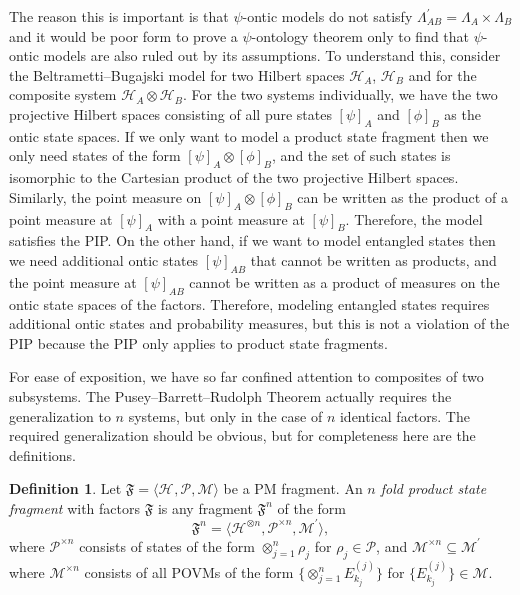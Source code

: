 \documentclass[DIV=calc,fontsize=12pt]{scrartcl} %
\theoremstyle{definition}
\newtheorem{definition}{Definition}[section]
\theoremstyle{plain}
\newcommand{\Proj}[1]{\ensuremath{\left [ #1 \right ]}}
\newcommand{\Hilb}[1][]{\ensuremath{\mathcal{H}_{#1}}}
\begin{document}
The reason this is important is that $\psi$-ontic models do not
satisfy $\Lambda^{\prime}_{AB} = \Lambda_A \times \Lambda_B$ and it
would be poor form to prove a $\psi$-ontology theorem only to find
that $\psi$-ontic models are also ruled out by its assumptions.  To
understand this, consider the Beltrametti--Bugajski model for two
Hilbert spaces $\Hilb[A]$, $\Hilb[B]$ and for the composite system
$\Hilb[A] \otimes \Hilb[B]$.  For the two systems individually, we
have the two projective Hilbert spaces consisting of all pure states
$\Proj{\psi}_A$ and $\Proj{\phi}_B$ as the ontic state spaces.  If we
only want to model a product state fragment then we only need states
of the form $\Proj{\psi}_A \otimes \Proj{\phi}_B$, and the set of such
states is isomorphic to the Cartesian product of the two projective
Hilbert spaces.  Similarly, the point measure on $\Proj{\psi}_A
\otimes \Proj{\phi}_B$ can be written as the product of a point
measure at $\Proj{\psi}_A$ with a point measure at $\Proj{\psi}_B$.
Therefore, the model satisfies the PIP\@.  On the other hand, if we
want to model entangled states then we need additional ontic states
$\Proj{\psi}_{AB}$ that cannot be written as products, and the point
measure at $\Proj{\psi}_{AB}$ cannot be written as a product of
measures on the ontic state spaces of the factors.  Therefore,
modeling entangled states requires additional ontic states and
probability measures, but this is not a violation of the PIP because
the PIP only applies to product state fragments.

For ease of exposition, we have so far confined attention to
composites of two subsystems.  The Pusey--Barrett--Rudolph Theorem actually requires the
generalization to $n$ systems, but only in the case of $n$ identical
factors.  The required generalization should be obvious, but for
completeness here are the definitions.

\begin{definition}
Let $\mathfrak{F} = \langle \Hilb, \mathcal{P}, \mathcal{M} \rangle$
be a PM fragment.  An \emph{$n$ fold product state fragment} with
factors $\mathfrak{F}$ is any fragment $\mathfrak{F}^n$ of the form
\begin{equation}
\mathfrak{F}^n = \langle \Hilb^{\otimes n},
\mathcal{P}^{\times n}, \mathcal{M}^{\prime} \rangle,
\end{equation}
where $\mathcal{P}^{\times n}$ consists of states of the form
$\otimes_{j=1}^n \rho_j$ for $\rho_j \in \mathcal{P}$, and
$\mathcal{M}^{\times n} \subseteq \mathcal{M}^{\prime}$ where
$\mathcal{M}^{\times n}$ consists of all POVMs of the form
$\{\otimes_{j=1}^n E^{(j)}_{k_j}\}$ for $\{E^{(j)}_{k_j}\} \in
\mathcal{M}$.
\end{definition}
\end{document}
